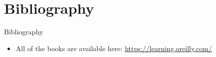 \documentclass[hyperref={hidelinks}]{beamer}
\begin{document}
  \section{Bibliography}
  \begin{frame}[allowframebreaks]{Bibliography}
    \begin{itemize}
      \item All of the books are available here:
      \href{https://learning.oreilly.com/}{\url{https://learning.oreilly.com/}}
    \end{itemize}
    \nocite{halder:2018,chio:2018,parisi:2019,tsukerman:2019,mueller:2019}
    \tiny
    \printbibliography
  \end{frame}
\end{document}

